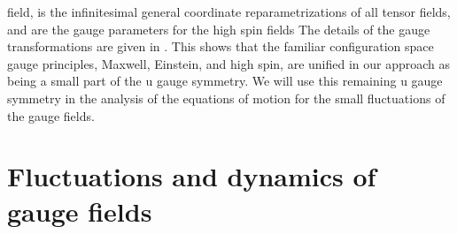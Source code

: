 \documentclass[a4paper,12pt]{article}
\begin{document}
field, \coordHE{} is the infinitesimal
general coordinate reparametrizations of all tensor fields, and \coordHE{} are the gauge parameters
for the high spin fields \coordHE{} The details of the
gauge transformations are given in \cite{highspin}. This shows that the
familiar configuration space gauge principles, Maxwell, Einstein, and high
spin, are unified in our approach as being a small part of the u\coordHE{} gauge symmetry. We will use this remaining u\coordHE{} gauge symmetry in the analysis of the equations of
motion for the small fluctuations of the gauge fields.

\section{Fluctuations and dynamics of gauge fields}
\end{document}

